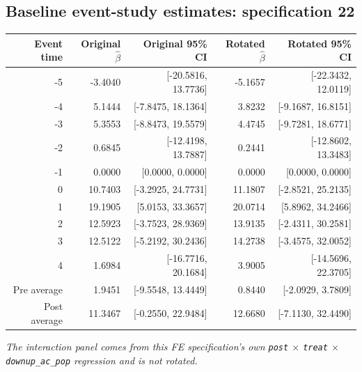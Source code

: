 \documentclass[10pt]{article}
\begin{document}
\subsection*{Baseline event-study estimates: specification 22}
\begin{center}
\scriptsize
\begin{tabular}{r rr rr}
\toprule
Event time & Original $\hat\beta$ & Original 95\% CI & Rotated $\hat\beta$ & Rotated 95\% CI \\
\midrule
-5 & -3.4040 & [-20.5816, 13.7736] & -5.1657 & [-22.3432, 12.0119] \\
-4 & 5.1444 & [-7.8475, 18.1364] & 3.8232 & [-9.1687, 16.8151] \\
-3 & 5.3553 & [-8.8473, 19.5579] & 4.4745 & [-9.7281, 18.6771] \\
-2 & 0.6845 & [-12.4198, 13.7887] & 0.2441 & [-12.8602, 13.3483] \\
-1 & 0.0000 & [0.0000, 0.0000] & 0.0000 & [0.0000, 0.0000] \\
0 & 10.7403 & [-3.2925, 24.7731] & 11.1807 & [-2.8521, 25.2135] \\
1 & 19.1905 & [5.0153, 33.3657] & 20.0714 & [5.8962, 34.2466] \\
2 & 12.5923 & [-3.7523, 28.9369] & 13.9135 & [-2.4311, 30.2581] \\
3 & 12.5122 & [-5.2192, 30.2436] & 14.2738 & [-3.4575, 32.0052] \\
4 & 1.6984 & [-16.7716, 20.1684] & 3.9005 & [-14.5696, 22.3705] \\
\midrule
Pre average & 1.9451 & [-9.5548, 13.4449] & 0.8440 & [-2.0929, 3.7809] \\
Post average & 11.3467 & [-0.2550, 22.9484] & 12.6680 & [-7.1130, 32.4490] \\
\bottomrule
\end{tabular}
\end{center}
\medskip
\textit{The interaction panel comes from this FE specification's own \texttt{post} $\times$ \texttt{treat} $\times$ \texttt{downup\_ac\_pop} regression and is not rotated.}
\clearpage
\end{document}
